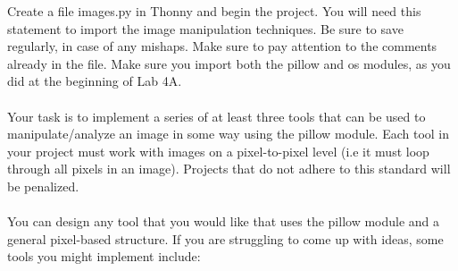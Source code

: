 \documentclass[11pt, letterpaper, onecolumn, oneside, final]{article}
\begin{document}
    Create a file {\consolas images.py} in Thonny and begin the project. You will need this statement to import the image manipulation techniques. Be sure to save regularly, in case of any mishaps. Make sure to pay attention to the comments already in the file. Make sure you import both the {\consolas pillow} and {\consolas os} modules, as you did at the beginning of Lab 4A.\\
    \\
  Your task is to implement a series of at least three tools that can be used to manipulate/analyze an image in some way using the {\consolas pillow} module. Each tool in your project must work with images on a pixel-to-pixel level (i.e it must loop through all pixels in an image). Projects that do not adhere to this standard will be penalized.  \\
  \\
  You can design any tool that you would like that uses the {\conslas pillow} module and a general pixel-based structure. If you are struggling to come up with ideas, some tools you might implement include:
\end{document}
